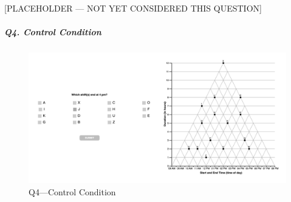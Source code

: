 \documentclass[
  letterpaper,
  DIV=11,
  numbers=noendperiod]{scrreprt}
\let\oldsubparagraph\subparagraph
\renewcommand{\subparagraph}[1]{\oldsubparagraph{#1}\mbox{}}
\begin{document}
{[}PLACEHOLDER --- NOT YET CONSIDERED THIS QUESTION{]}

\hypertarget{q4.-control-condition}{%
\subparagraph{Q4. Control Condition}\label{q4.-control-condition}}

\begin{figure}

{\centering \includegraphics{analysis/SGC3A/static/questions/Q4_111.png}

}

\caption{\label{fig-Q4-111}Q4---Control Condition}

\end{figure}
\end{document}
